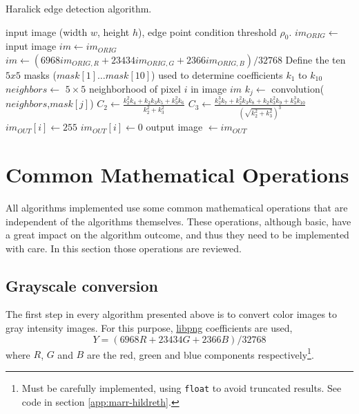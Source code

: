 \documentclass{ipol}
\numberwithin{equation}{section}
\numberwithin{table}{section}
\numberwithin{figure}{section}
\begin{document}
\begin{algorithm}[t]
\caption{Haralick edge detection algorithm.}
\label{algo:haralick}
\begin{algorithmic}[1]
\REQUIRE input image (width $w$, height $h$), edge point condition threshold $\rho_0$.
\STATE $im_{ORIG} \leftarrow$ input image
	\STATE $im \leftarrow im_{ORIG}$
\ELSE 
	\STATE $im \leftarrow (6968im_{ORIG,R}+23434im_{ORIG,G}+2366im_{ORIG,B})/32768$ 
\ENDIF
\STATE Define the ten $5x5$ masks ($mask[1]\dots mask[10]$) used to determine coefficients $k_1$ to $k_{10}$ 
	\STATE $neighbors \leftarrow$ $5\times5$ neighborhood of pixel $i$ in image $im$
		\STATE $k_j \leftarrow$ convolution($neighbors$,$mask[j]$)
	\ENDFOR
	\STATE $C_2 \leftarrow \frac{k_2^2k_4 + k_2k_3k_5 + k_3^2k_6}{k_2^2 + k_3^2}$
	\STATE $C_3 \leftarrow \frac{k_2^3k_7 + k_2^2k_3k_8 + k_2k_3^2k_9 + k_3^3k_{10}}{(\sqrt{k_2^2 + k_3^2})^3}$
		\STATE $im_{OUT}[i] \leftarrow 255$
	\ELSE
		\STATE $im_{OUT}[i] \leftarrow 0$
	\ENDIF
\ENDFOR
\RETURN output image $\leftarrow im_{OUT}$
\end{algorithmic}
\end{algorithm}


\section{Common Mathematical Operations}
\label{sec:appendix1}

All algorithms implemented use some common mathematical operations that are independent of the algorithms themselves. 
These operations, although basic, have a great impact on the algorithm outcome, and thus they need to be 
implemented with care. In this section those operations are reviewed.


\subsection{Grayscale conversion}
\label{sec:grayscale}

The first step in every algorithm presented above is to convert color images to gray intensity images. 
For this purpose, \href{http://www.libpng.org/}{libpng} coefficients are used,
\begin{equation}
    Y = (6968 R + 23434 G + 2366 B) / 32768
\end{equation}
where $R$, $G$ and $B$ are the red, green and blue components respectively\footnote{Must be carefully implemented, using \texttt{float} to avoid truncated results. See code in section \ref{app:marr-hildreth}.}.
\end{document}
